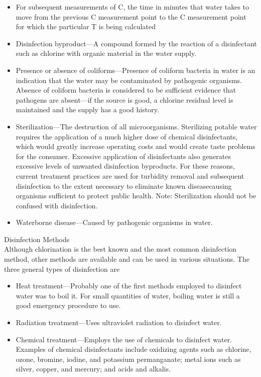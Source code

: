 \documentclass{article}
\begin{document}
\begin{itemize}
\item For subsequent measurements of C, the time in minutes that water takes to move from the previous C measurement point to the C measurement point for which the particular T is being calculated
\item Disinfection byproduct—A compound formed by the reaction of a disinfectant such as chlorine with organic material in the water supply.
\item Presence or absence of coliforms—Presence of coliform bacteria in water is an indication that the water may be contaminated by pathogenic organisms. Absence of coliform bacteria is considered to be sufficient evidence that pathogens are absent—if the source is good, a chlorine residual level is maintained and the supply has a good history.
\item Sterilization—The destruction of all microorganisms. Sterilizing potable water requires the application of a much higher dose of chemical disinfectants, which would greatly increase operating costs and would create taste problems for the consumer. Excessive application of disinfectants also generates excessive levels of unwanted disinfection byproducts. For these reasons, current treatment practices are used for turbidity removal and subsequent disinfection to the extent necessary to eliminate known diseasecausing organisms sufficient to protect public health.
Note: Sterilization should not be confused with disinfection.
\item Waterborne disease—Caused by pathogenic organisms in water.
\end{itemize}
Disinfection Methods\\
Although chlorination is the best known and the most common disinfection method, other methods are available and can be used in various situations. The three general types of disinfection are
\begin{itemize}
\item Heat treatment—Probably one of the first methods employed to disinfect water was to boil it. For small quantities of water, boiling water is still a good emergency procedure to use.
\item Radiation treatment—Uses ultraviolet radiation to disinfect water.
\item Chemical treatment—Employs the use of chemicals to disinfect water. Examples of chemical disinfectants include oxidizing agents such as chlorine, ozone, bromine, iodine, and potassium permanganate; metal ions such as silver, copper, and mercury; and acids and alkalis.
\end{itemize}
\end{document}
